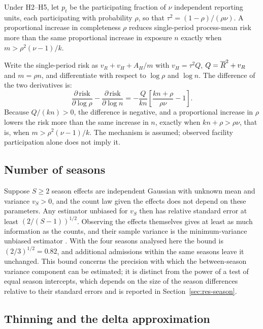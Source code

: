 \begin{corollary}
\label{cor:switch}
Under H2--H5, let $p_t$ be the participating fraction of $\nu$ independent reporting units, each participating with probability $\rho$, so that $\tau^2=(1-\rho)/(\rho\nu)$. A proportional increase in completeness $\rho$ reduces single-period process-mean risk more than the same proportional increase in exposure $n$ exactly when $m>\rho^2(\nu-1)/k$.
\end{corollary}

Write the single-period risk as $v_R+v_H+A_H/m$ with $v_H=\tau^2Q$, $Q=\overline{R}^2+v_R$ and $m=\rho n$, and differentiate with respect to $\log\rho$ and $\log n$. The difference of the two derivatives is:
\begin{equation}
 \frac{\partial\,\mathrm{risk}}{\partial\log\rho}-\frac{\partial\,\mathrm{risk}}{\partial\log n}
 =-\frac{Q}{kn}\left[\frac{kn+\rho}{\rho\nu}-1\right].
\end{equation}
Because $Q/(kn)>0$, the difference is negative, and a proportional increase in $\rho$ lowers the risk more than the same increase in $n$, exactly when $kn+\rho>\rho\nu$, that is, when $m>\rho^2(\nu-1)/k$. The mechanism is assumed; observed facility participation alone does not imply it.

\subsection{Number of seasons}
\label{app:seasons}

Suppose $S\ge2$ season effects are independent Gaussian with unknown mean and variance $v_S>0$, and the count law given the effects does not depend on these parameters. Any estimator unbiased for $v_S$ then has relative standard error at least $(2/(S-1))^{1/2}$. Observing the effects themselves gives at least as much information as the counts, and their sample variance is the minimum-variance unbiased estimator \citep{lehmann1998theory, searle1992variance}. With the four seasons analysed here the bound is $(2/3)^{1/2}=0.82$, and additional admissions within the same seasons leave it unchanged. This bound concerns the precision with which the between-season variance component can be estimated; it is distinct from the power of a test of equal season intercepts, which depends on the size of the season differences relative to their standard errors and is reported in Section~\ref{sec:res-season}.

\subsection{Thinning and the delta approximation}
\label{app:thinning-exact}

